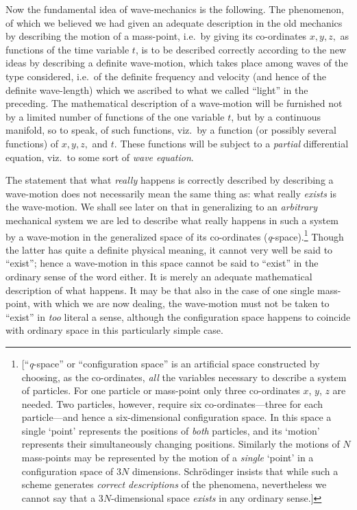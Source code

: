 Now the fundamental idea of wave-mechanics is the following. The
phenomenon, of which we believed we had given an adequate description in
the old mechanics by describing the motion of a mass-point, i.e.\ by
giving its co-ordinates $x, y, z,$ as functions of the
time variable $t$, is to be described correctly according to the
new ideas by describing a definite wave-motion, which takes place among
waves of the type considered, i.e.\ of the definite frequency and
velocity (and hence of the definite wave-length) which we ascribed to
what we called ``light'' in the preceding. The mathematical description
of a wave-motion will be furnished not by a limited number of functions
of the one variable $t$, but by a continuous manifold, so to speak,
of such functions, viz.\ by a function (or possibly several functions) of
$x, y, z,$ and $t$. These functions will be
subject to a \emph{partial} differential equation, viz.\ to some sort of
\emph{wave equation}.

The statement that what \emph{really} happens is correctly described by
describing a wave-motion does not necessarily mean the same thing as:
what really \emph{exists} is the wave-motion. We shall see later on that 
in generalizing to an \emph{arbitrary} mechanical system we are led to describe
what really happens in such a system by a wave-motion in the generalized
space of its co-ordinates (\emph{q}-space).\footnote{%
[``\emph{q}-space'' or
``configuration space'' is an artificial space constructed by choosing, 
as the co-ordinates, \emph{all} the variables necessary to describe a system
of particles. For one particle or mass-point only three co-ordinates $x$, $y$, $z$
are needed. Two particles, however, require six co-ordinates---three for each
particle---and hence a six-dimensional configuration space. In this space a single
`point' represents the positions of \emph{both} particles, and its `motion' represents
their simultaneously changing positions. Similarly the motions of $N$ mass-points
may be represented by the motion of a \emph{single} `point' in a configuration
space of 3$N$ dimensions. Schrödinger insists that while such a scheme generates
\emph{correct descriptions} of the phenomena, nevertheless we cannot say that
a 3$N$-dimensional space \emph{exists} in any ordinary sense.]} 
Though the latter has quite a definite
physical meaning, it cannot very well be said to ``exist''; hence a wave-motion
in this space cannot be said to ``exist'' in the ordinary sense of the word either.
It is merely an adequate mathematical description of what happens. 
It may be that also in the case of one single mass-point, with which
we are now dealing, the wave-motion must not be taken to ``exist'' in \emph{too}
literal a sense, although the configuration space happens to coincide
with ordinary space in this particularly simple case.

